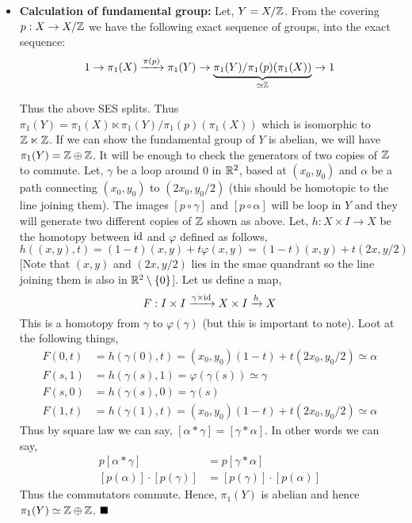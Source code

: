 \documentclass[11pt]{article}
\begin{document}
\begin{itemize}
  \item \textbf{\textsf{Calculation of fundamental group: }} Let, $Y = X/\mathbb{Z}$. From the covering $p: X \to X/\mathbb{Z}$ we have the following exact sequence of groups, 
  into the exact sequence:
      $$
      1\to\pi_1(X)\xrightarrow{\pi(p)}\pi_1(Y)\to \underbrace{\pi_1(Y)/\pi_1(p)(\pi_1(X))}_{\simeq \mathbb{Z}}\to 1
      $$
  
  Thus the above SES splits. Thus $\pi_1(Y)= \pi_1(X) \ltimes \pi_1(Y)/\pi_1(p)(\pi_1(X))$ which is isomorphic to $\mathbb{Z} \ltimes \mathbb{Z}$. If we can show the fundamental group of $Y$ is abelian, we will have $\pi_1(Y)= \mathbb{Z} \oplus \mathbb{Z}$. It will be enough to check the generators of two copies of $\mathbb{Z}$ to commute. Let, $\gamma$ be a loop around $0$ in $\mathbb{R}^2$, based at $(x_0,y_0)$ and $\alpha$ be a path connecting $(x_0,y_0)$ to $(2x_0,y_0/2)$ (this should be homotopic to the line joining them). The images $[p\circ \gamma]$ and $[p\circ \alpha]$ will be loop in $Y$ and they will generate two different copies of $\mathbb{Z}$ shown as above. Let, $h:X \times I \to X$ be the homotopy between $\mathrm{id}$ and $\varphi$ defined as follows, $$h((x,y),t)=(1-t)(x,y)+t\varphi(x,y)= (1-t)(x,y) + t(2x,y/2)$$
  [Note that $(x,y)$ and $(2x,y/2)$ lies in the smae quandrant so the line joining them is also in $\mathbb{R}^2\setminus \qty{0}$]. Let us define a map, $$F : I \times I \xrightarrow{\gamma \times \mathrm{id}}X \times I \xrightarrow{h}X$$ 
 This is a homotopy from $\gamma$ to $\varphi(\gamma)$ (but this is important to note). Loot at the following things, \begin{align*}
  F(0,t)&=h(\gamma(0),t)= (x_0,y_0)(1-t)+ t(2x_0,y_0/2) \simeq \alpha  \\
  F(s,1)&= h(\gamma(s),1) = \varphi(\gamma(s)) \simeq \gamma \\
  F(s,0)&= h(\gamma(s),0)= \gamma(s)\\
  F(1,t)&= h(\gamma(1),t)= (x_0,y_0)(1-t)+t(2x_0,y_0/2) \simeq \alpha
 \end{align*}
Thus by square law we can say, $[\alpha \ast \gamma] = [\gamma \ast \alpha]$. In other words we can say, \begin{align*}
  p[\alpha \ast \gamma] &= p[\gamma \ast \alpha]\\
  [p(\alpha)]\cdot [p(\gamma)] &= [p(\gamma)]\cdot [p(\alpha)]
\end{align*}
Thus the commutators commute. Hence, $\pi_1(Y)$ is abelian and hence $\pi_1(Y)\simeq \mathbb{Z} \oplus \mathbb{Z}$.  $\hfill \blacksquare$
\end{itemize}
\end{document}
